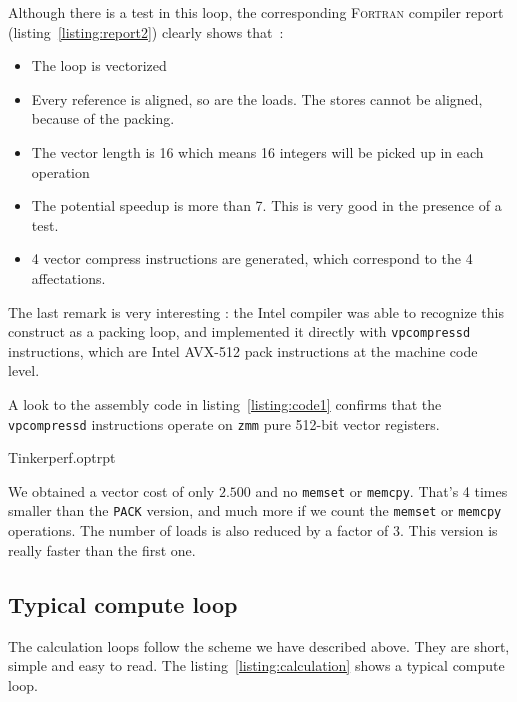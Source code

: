 \documentclass[9pt,comparison]{livecoms}
\newcommand{\lv}{\Large\verb}
\begin{document}
Although there is a test in this loop, the corresponding \textsc{Fortran} compiler report (listing~\ref{listing:report2})  clearly shows that~:
\begin{itemize}
    \item The loop is vectorized
    \item Every reference is aligned, so are the loads. The stores cannot be aligned, because of the packing.
    \item The vector length is 16 which means 16 integers will be picked up in each operation
    \item The potential speedup is more than 7. This is very good in the presence of a test. 
    \item 4 vector compress instructions are generated, which correspond to the 4 affectations.
\end{itemize}


The last remark is very interesting : the Intel compiler was able to recognize this construct as a packing loop, and implemented it directly with {\color{codegreen}\lv|vpcompressd|} instructions, which are Intel AVX-512 pack instructions at the machine code level. 

A look to the assembly code in listing~\ref{listing:code1} confirms that the {\color{codegreen}\lv|vpcompressd|} instructions operate on {\color{red}\lv|zmm|} pure 512-bit vector registers.

 {Tinkerperf.optrpt}



We obtained a vector cost of only $2.500$ and no {\color{codegreen}\lv|memset|} or {\color{codegreen}\lv|memcpy|}. That's 4 times smaller than the {\color{blue}\lv|PACK|} version, and much more if we count the {\color{codegreen}\lv|memset|} or {\color{codegreen}\lv|memcpy|} operations. The number of loads is also reduced by a factor of 3. This version is really faster than the first one.

\subsection{Typical compute loop} 
\hspace{\parindent}The calculation loops follow the scheme we have described above. They are short, simple and easy to read. The listing~\ref{listing:calculation} shows a typical compute loop.
\end{document}

